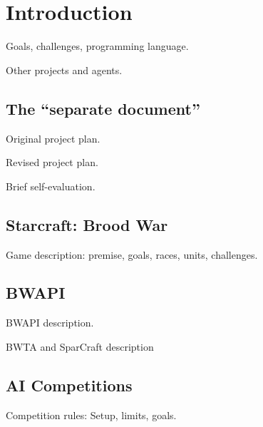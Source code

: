 \chapter{Introduction}

Goals, challenges, programming language.

Other projects and agents.

\section{The ``separate document''}
Original project plan.

Revised project plan.

Brief self-evaluation.

\section{Starcraft: Brood War}

Game description: premise, goals, races, units, challenges.

\section{BWAPI}

BWAPI description.

BWTA and SparCraft description

\section{AI Competitions}

Competition rules: Setup, limits, goals.